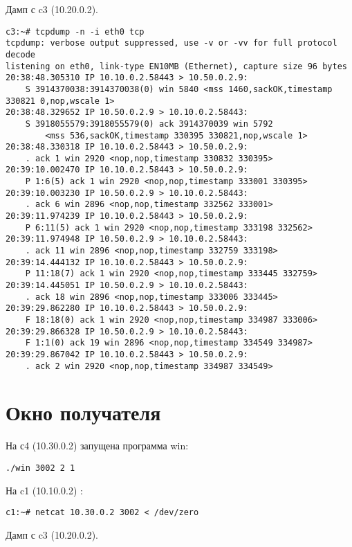 \documentclass[a4paper,12pt]{article}
\begin{document}
Дамп с c3 (10.20.0.2).

\begin{Verbatim}
c3:~# tcpdump -n -i eth0 tcp
tcpdump: verbose output suppressed, use -v or -vv for full protocol decode
listening on eth0, link-type EN10MB (Ethernet), capture size 96 bytes
20:38:48.305310 IP 10.10.0.2.58443 > 10.50.0.2.9: 
    S 3914370038:3914370038(0) win 5840 <mss 1460,sackOK,timestamp 330821 0,nop,wscale 1>
20:38:48.329652 IP 10.50.0.2.9 > 10.10.0.2.58443: 
    S 3918055579:3918055579(0) ack 3914370039 win 5792 
        <mss 536,sackOK,timestamp 330395 330821,nop,wscale 1>
20:38:48.330318 IP 10.10.0.2.58443 > 10.50.0.2.9: 
    . ack 1 win 2920 <nop,nop,timestamp 330832 330395>
20:39:10.002470 IP 10.10.0.2.58443 > 10.50.0.2.9: 
    P 1:6(5) ack 1 win 2920 <nop,nop,timestamp 333001 330395>
20:39:10.003230 IP 10.50.0.2.9 > 10.10.0.2.58443: 
    . ack 6 win 2896 <nop,nop,timestamp 332562 333001>
20:39:11.974239 IP 10.10.0.2.58443 > 10.50.0.2.9: 
    P 6:11(5) ack 1 win 2920 <nop,nop,timestamp 333198 332562>
20:39:11.974948 IP 10.50.0.2.9 > 10.10.0.2.58443: 
    . ack 11 win 2896 <nop,nop,timestamp 332759 333198>
20:39:14.444132 IP 10.10.0.2.58443 > 10.50.0.2.9: 
    P 11:18(7) ack 1 win 2920 <nop,nop,timestamp 333445 332759>
20:39:14.445051 IP 10.50.0.2.9 > 10.10.0.2.58443: 
    . ack 18 win 2896 <nop,nop,timestamp 333006 333445>
20:39:29.862280 IP 10.10.0.2.58443 > 10.50.0.2.9: 
    F 18:18(0) ack 1 win 2920 <nop,nop,timestamp 334987 333006>
20:39:29.866328 IP 10.50.0.2.9 > 10.10.0.2.58443: 
    F 1:1(0) ack 19 win 2896 <nop,nop,timestamp 334549 334987>
20:39:29.867042 IP 10.10.0.2.58443 > 10.50.0.2.9: 
    . ack 2 win 2920 <nop,nop,timestamp 334987 334549>
\end{Verbatim}

\section{Окно получателя}

На с4 (10.30.0.2) запущена программа win: 
\begin{Verbatim}
./win 3002 2 1
\end{Verbatim}

На c1 (10.10.0.2) : 
\begin{Verbatim}
c1:~# netcat 10.30.0.2 3002 < /dev/zero
\end{Verbatim}

Дамп с c3 (10.20.0.2).
\end{document}

